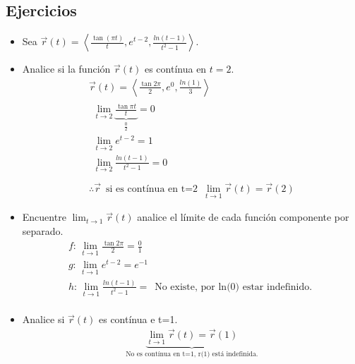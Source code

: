 \subsection{Ejercicios}
\begin{itemize}
    \item Sea $\vec{r}(t)=\left\langle \frac{\tan(\pi t)}{t} , e^{t-2}, \frac{ln(t-1)}{t^2-1}  \right\rangle $.
    \item Analice si la función $\vec{r}(t)$ es contínua en $t=2$.
        \begin{align*}
            \vec{r}(t) = \left\langle \frac{\tan 2\pi }{2}, e^0, \frac{ln(1)}{3}   \right\rangle \\ 
            \begin{matrix}
                \lim_{t \to 2} \underbrace{\frac{\tan \pi t}{t}}_{\frac{0}{2} } = 0 \\
                \lim_{t \to 2} e^{t-2} = 1 \\ 
                \lim_{t \to 2} \frac{ln(t-1)}{t^2-1} = 0 \\ 
            \end{matrix} \\ 
            \therefore \vec{r} \, \text{ si es contínua en t=2   } \, \lim_{t \to 1} \vec{r}(t) = \vec{r}(2)
        \end{align*}
    
    \item Encuentre $\lim_{t \to 1} \vec{r}(t)$ analice el límite de cada función componente por separado.
        \begin{align*}
            f: \, \lim_{t \to 1} \frac{\tan 2\pi }{2} = \frac{0}{1}  \\ 
            g: \, \lim_{t \to 1} e^{t-2} = e^{-1} \\ 
            h: \, \lim_{t \to 1} \frac{ln(t-1)}{t^2-1} = \, \text{  No existe, por ln(0) estar indefinido.  } \\ 
        \end{align*}
    
    \item Analice si $\vec{r}(t)$ es contínua e t=1.
        \begin{align*}
            \underbrace{\lim_{t \to 1} \vec{r}(t) = \vec{r}(1) }_{\text{  No es contínua en t=1, r(1) está indefinida.  }}\\ 
        \end{align*}
    

\end{itemize}
